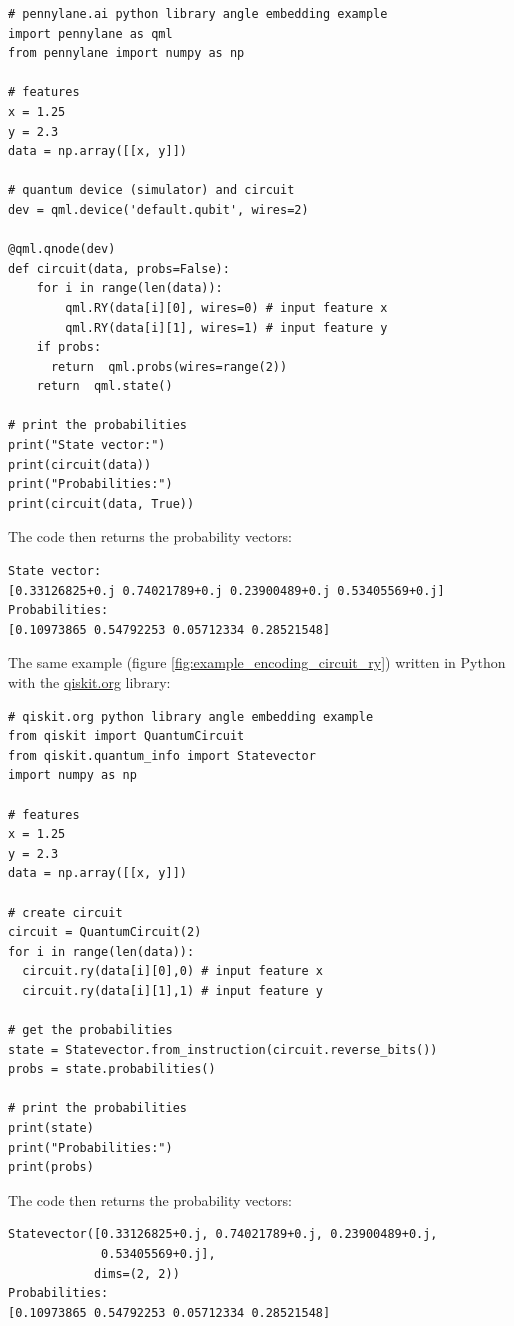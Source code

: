 \begin{verbatim}
# pennylane.ai python library angle embedding example
import pennylane as qml
from pennylane import numpy as np

# features
x = 1.25
y = 2.3
data = np.array([[x, y]])

# quantum device (simulator) and circuit
dev = qml.device('default.qubit', wires=2)

@qml.qnode(dev)
def circuit(data, probs=False):
    for i in range(len(data)):
        qml.RY(data[i][0], wires=0) # input feature x
        qml.RY(data[i][1], wires=1) # input feature y
    if probs:
      return  qml.probs(wires=range(2))
    return  qml.state()

# print the probabilities
print("State vector:")
print(circuit(data))
print("Probabilities:")
print(circuit(data, True))
\end{verbatim}

\noindent The code then returns the probability vectors:
\begin{verbatim}
State vector:
[0.33126825+0.j 0.74021789+0.j 0.23900489+0.j 0.53405569+0.j]
Probabilities:
[0.10973865 0.54792253 0.05712334 0.28521548]
\end{verbatim}

\newpage
\noindent The same example (figure \ref{fig:example_encoding_circuit_ry}) written in Python with the \href{https://qiskit.org/documentation/}{qiskit.org} library:

\begin{verbatim}
# qiskit.org python library angle embedding example
from qiskit import QuantumCircuit
from qiskit.quantum_info import Statevector
import numpy as np

# features
x = 1.25
y = 2.3
data = np.array([[x, y]])

# create circuit
circuit = QuantumCircuit(2)
for i in range(len(data)):
  circuit.ry(data[i][0],0) # input feature x
  circuit.ry(data[i][1],1) # input feature y

# get the probabilities
state = Statevector.from_instruction(circuit.reverse_bits())
probs = state.probabilities()

# print the probabilities
print(state)
print("Probabilities:")
print(probs)
\end{verbatim}

\noindent The code then returns the probability vectors:
\begin{verbatim}
Statevector([0.33126825+0.j, 0.74021789+0.j, 0.23900489+0.j,
             0.53405569+0.j],
            dims=(2, 2))
Probabilities:
[0.10973865 0.54792253 0.05712334 0.28521548]
\end{verbatim}


